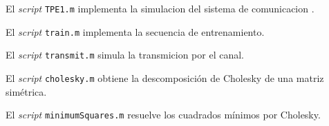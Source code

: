 \documentclass{article}
\begin{document}
\begin{ttfamily}
\begin{center}
\end{center}
\end{ttfamily}

\par El \textit{script} \verb+TPE1.m+ implementa la simulacion del sistema de comunicacion .

\begin{ttfamily}
\begin{center}
\end{center}
\end{ttfamily}

\par El \textit{script} \verb+train.m+ implementa la secuencia de entrenamiento.

\begin{ttfamily}
\begin{center}
\end{center}
\end{ttfamily}

\par El \textit{script} \verb+transmit.m+ simula la transmicion por el canal.

\begin{ttfamily}
\begin{center}
\end{center}
\end{ttfamily}

\par El \textit{script} \verb+cholesky.m+ obtiene la descomposición de Cholesky de una matriz simétrica.

\begin{ttfamily}
\begin{center}
\end{center}
\end{ttfamily}

\par El \textit{script} \verb+minimumSquares.m+ resuelve los cuadrados mínimos por Cholesky.

\begin{ttfamily}
\begin{center}
\end{center}
\end{ttfamily}
\end{document}
